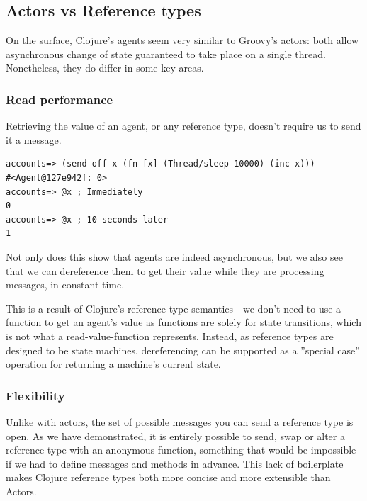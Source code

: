 \documentclass[a4paper,12pt]{kth-mag}
\begin{document}
\subsection{Actors vs Reference types}

On the surface, Clojure's agents seem very similar to Groovy's actors: both allow asynchronous change of state guaranteed to take place on a single thread. Nonetheless, they do differ in some key areas.

\subsubsection{Read performance}

Retrieving the value of an agent, or any reference type, doesn't require us to send it a message. 

\begin{listing}[H]
	\begin{verbatim}
accounts=> (send-off x (fn [x] (Thread/sleep 10000) (inc x)))
#<Agent@127e942f: 0>
accounts=> @x ; Immediately
0
accounts=> @x ; 10 seconds later
1
	\end{verbatim}
\end{listing}

Not only does this show that agents are indeed asynchronous, but we also see that we can dereference them to get their value while they are processing messages, in constant time.

This is a result of Clojure's reference type semantics - we don't need to use a function to get an agent's value as functions are solely for state transitions, which is not what a read-value-function represents. Instead, as reference types are designed to be state machines, dereferencing can be supported as a ''special case'' operation for returning a machine's current state.

\subsubsection{Flexibility}

Unlike with actors, the set of possible messages you can send a reference type is open. As we have demonstrated, it is entirely possible to send, swap or alter a reference type with an anonymous function, something that would be impossible if we had to define messages and methods in advance. This lack of boilerplate makes Clojure reference types both more concise and more extensible than Actors.
\end{document}
